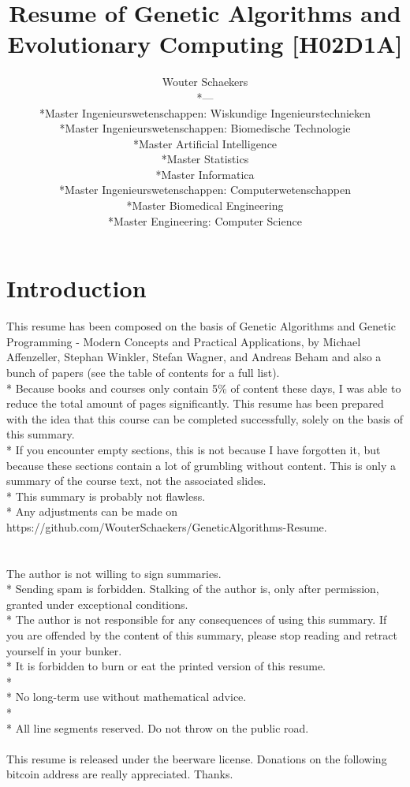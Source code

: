\documentclass[12pt]{article}
\title{Resume of Genetic Algorithms and Evolutionary Computing [H02D1A]}
\author{Wouter Schaekers\\*---\\*Master Ingenieurswetenschappen: Wiskundige Ingenieurstechnieken\\*Master Ingenieurswetenschappen: Biomedische Technologie\\*Master Artificial Intelligence\\*Master Statistics\\*Master Informatica\\*Master Ingenieurswetenschappen: Computerwetenschappen\\*Master Biomedical Engineering\\*Master Engineering: Computer Science}
\begin{document}
\maketitle
\setcounter{section}{-1}
\setcounter{page}{0}
\renewcommand{\contentsname}{Table of Contents}
\setcounter{tocdepth}{3}
\tableofcontents
\clearpage
\section{Introduction}
This resume has been composed on the basis of Genetic Algorithms and Genetic Programming - Modern Concepts and Practical Applications, by Michael Affenzeller, Stephan Winkler, Stefan Wagner, and Andreas Beham and also a bunch of papers (see the table of contents for a full list).\\*
Because books and courses only contain 5\% of content these days, I was able to reduce the total amount of pages significantly. This resume has been prepared with the idea that this course can be completed successfully, solely on the basis of this summary.\\*
If you encounter empty sections, this is not because I have forgotten it, but because these sections contain a lot of grumbling without content.
This is only a summary of the course text, not the associated slides.\\*
This summary is probably not flawless.\\*
Any adjustments can be made on https://github.com/WouterSchaekers/GeneticAlgorithms-Resume.\\\\\\
The author is not willing to sign summaries.\\*
Sending spam is forbidden. Stalking of the author is, only after permission, granted under exceptional conditions.\\*
The author is not responsible for any consequences of using this summary. If you are offended by the content of this summary, please stop reading and retract yourself in your bunker.\\*
It is forbidden to burn or eat the printed version of this resume.\\*\\*
No long-term use without mathematical advice.\\*\\*
All line segments reserved. Do not throw on the public road.\\\\
This resume is released under the beerware license. Donations on the following bitcoin address are really appreciated. Thanks.\\\\
\end{document}
